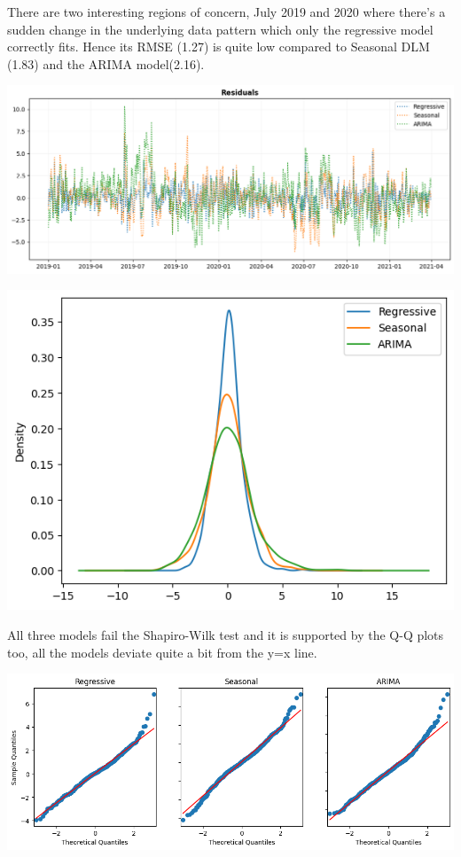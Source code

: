 \documentclass[a4paper,12pt]{article}
\begin{document}
There are two interesting regions of concern, July 2019 and 2020 where there's a sudden change in the underlying data pattern which only the regressive model correctly fits. Hence its RMSE (1.27) is quite low compared to Seasonal DLM (1.83) and the ARIMA model(2.16).

\begin{center}
\includegraphics[width=1.00\textwidth]{./images/jafrabad/resid.png}
\end{center}

\begin{center}
\includegraphics[width=0.8\linewidth]{./images/jafrabad/dist.png}
\end{center}

All three models fail the Shapiro-Wilk test and it is supported by the Q-Q plots too, all the models deviate quite a bit from the y=x line.

\begin{center}
\includegraphics[width=0.8\linewidth]{./images/jafrabad/qq.png}
\end{center}
\end{document}
